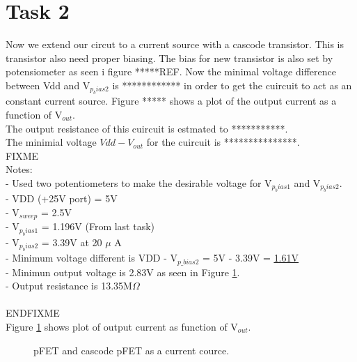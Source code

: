 \documentclass[a4paper,english,11pt]{article}
\begin{document}
\section{Task 2}
Now we extend our circut to a current source with a cascode transistor. This is transistor also need proper biasing. The bias for new transistor is also set by potensiometer as seen i figure *****REF.
Now the minimal voltage difference between Vdd and V$_{p_bias2}$ is ************ in order to get the cuircuit to act as an constant current source.
Figure ***** shows a plot of the \colorbox{blue!30}{output current} as a function of V$_{out}$. \\
The output resistance of this cuircuit is estmated to ***********.\\
The minimial voltage $Vdd - V_{out}$ for the cuircuit is ***************.\\


\colorbox{red!30}{FIXME}\\
Notes:\\
- Used two potentiometers to make the desirable voltage for V$_{p_bias1}$ and V$_{p_bias2}$.\\
- VDD (+25V port) = 5V\\
- V$_{sweep}$ = 2.5V\\
- V$_{p_bias1}$ = 1.196V (From last task)\\
- V$_{p_bias2}$ = 3.39V at 20 $\mu$ A\\
- Minimum voltage different is VDD - V$_{p\_bias2}$ = 5V - 3.39V = \underline{\underline{1.61V}}\\
- Minimun output voltage is 2.83V as seen in Figure \ref{fig:pfet-cascode-pfet}.\\
- Output resistance is 13.35M$\Omega$\\
\\
\colorbox{red!30}{ENDFIXME}\\

Figure \ref{fig:pfet-cascode-pfet} shows plot of output current as function of V$_{out}$.
\begin{figure}[htbp]
 \centering
  \caption{pFET and cascode pFET as a current cource.}
  \label{fig:pfet-cascode-pfet}	
\end{figure}
\end{document}
